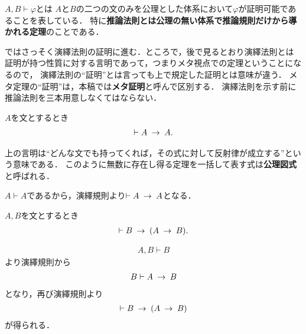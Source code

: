 	$A,B \vdash \varphi$とは
	$A$と$B$の二つの文のみを公理とした体系において$\varphi$が証明可能であることを表している．
	特に{\bf 推論法則とは公理の無い体系で推論規則だけから導かれる定理}のことである．
	
	ではさっそく演繹法則の証明に進む．ところで，後で見るとおり演繹法則とは
	証明が持つ性質に対する言明であって，つまりメタ視点での定理ということになるので，
	演繹法則の``証明''とは言っても上で規定した証明とは意味が違う．
	メタ定理の``証明''は，本稿では{\bf メタ証明}と呼んで区別する．
	演繹法則を示す前に推論法則を三本用意しなくてはならない．
	
	\begin{screen}
		\begin{logicalthm}[含意の反射律]\label{logicalthm:reflective_law_of_implication}
			$A$を文とするとき
			\begin{align}
				\vdash A \hspace{0.25em}\rightarrow\hspace{0.25em} A.
			\end{align}
		\end{logicalthm}
	\end{screen}
	
	上の言明は``どんな文でも持ってくれば，その式に対して反射律が成立する''という意味である．
	このように無数に存在し得る定理を一括して表す式は{\bf 公理図式}と呼ばれる．
	
	\begin{prf}
		$A \vdash A$であるから，演繹規則より$\vdash A \hspace{0.25em}\rightarrow\hspace{0.25em} A$となる．
		\QED
	\end{prf}
	
	\begin{screen}
		\begin{logicalthm}[含意の導入]\label{logicalthm:rule_of_inference_2}
			$A,B$を文とするとき
			\begin{align}
				\vdash B \hspace{0.25em}\rightarrow\hspace{0.25em} (A \hspace{0.25em}\rightarrow\hspace{0.25em} B).
			\end{align}
		\end{logicalthm}
	\end{screen}
	
	\begin{prf}
		\begin{align}
			A,B \vdash B
		\end{align}
		より演繹規則から
		\begin{align}
			B \vdash A \hspace{0.25em}\rightarrow\hspace{0.25em} B
		\end{align}
		となり，再び演繹規則より
		\begin{align}
			\vdash B \hspace{0.25em}\rightarrow\hspace{0.25em} (A \hspace{0.25em}\rightarrow\hspace{0.25em} B)
		\end{align}
		が得られる．
		\QED
	\end{prf}
	
